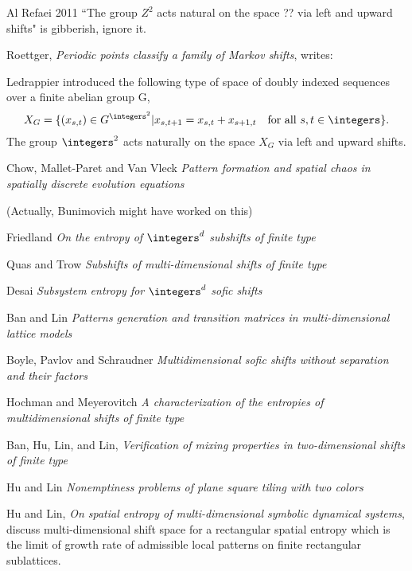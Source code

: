 \begin{description}
{Al Refaei 2011
``The group $Z^2$ acts natural on the space ?? via left and upward shifts"
is gibberish, ignore it.

Roettger,
{\em Periodic points classify a family of Markov shifts}, writes:

Ledrappier introduced the following type of space of doubly indexed
sequences over a finite abelian group G,
\[
X_G=\{(x_{s,t}) \in G^{\integers^2} | x_{s,t+1}=x_{s,t}+x_{s+1,t}
\quad \mbox{for all }s,t\in \integers\}.
\]
The group $\integers^2$ acts naturally on the space $X_G$ via left and upward shifts.

Chow, Mallet-Paret and Van Vleck
{\em Pattern formation and spatial chaos in spatially discrete evolution equations}

(Actually, Bunimovich might have worked on this)

Friedland
{\em On the entropy of {$\integers^d$} subshifts of finite type}

Quas and Trow
{\em Subshifts of multi-dimensional shifts of finite type}

Desai
{\em Subsystem entropy for $\integers^d$ sofic shifts}

{Ban} and {Lin} {\em Patterns generation and transition
matrices in multi-dimensional lattice models}

Boyle, Pavlov and Schraudner
{\em Multidimensional sofic shifts without separation and their factors}

Hochman and Meyerovitch
{\em A characterization of the entropies of multidimensional shifts of finite type}

{Ban}, {Hu}, {Lin}, and {Lin}, {\em Verification of mixing
properties in two-dimensional shifts of finite type}

Hu and Lin
   {\em Nonemptiness problems of plane square tiling with two colors}

Hu and Lin,
 {\em On spatial entropy of multi-dimensional symbolic dynamical systems},
discuss multi-dimensional shift space for a rectangular spatial entropy
which is the limit of growth rate of admissible local patterns on finite
rectangular sublattices.
    }


\end{description}
